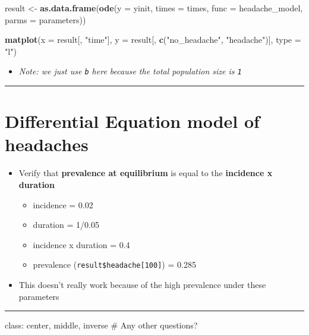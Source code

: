 \documentclass[]{article}
\newenvironment{Shaded}{\begin{snugshade}}{\end{snugshade}}
\newcommand{\KeywordTok}[1]{\textcolor[rgb]{0.13,0.29,0.53}{\textbf{#1}}}
\newcommand{\DataTypeTok}[1]{\textcolor[rgb]{0.13,0.29,0.53}{#1}}
\newcommand{\StringTok}[1]{\textcolor[rgb]{0.31,0.60,0.02}{#1}}
\newcommand{\NormalTok}[1]{#1}
\providecommand{\tightlist}{%
  \setlength{\itemsep}{0pt}\setlength{\parskip}{0pt}}
\begin{document}
\begin{Shaded}
\begin{Highlighting}[]
\NormalTok{result <-}\StringTok{ }\KeywordTok{as.data.frame}\NormalTok{(}\KeywordTok{ode}\NormalTok{(}\DataTypeTok{y =}\NormalTok{ yinit, }\DataTypeTok{times =}\NormalTok{ times, }
                            \DataTypeTok{func =}\NormalTok{ headache_model, }\DataTypeTok{parms =}\NormalTok{ parameters))}

\KeywordTok{matplot}\NormalTok{(}\DataTypeTok{x =}\NormalTok{ result[, }\StringTok{"time"}\NormalTok{], }
        \DataTypeTok{y =}\NormalTok{ result[, }\KeywordTok{c}\NormalTok{(}\StringTok{"no_headache"}\NormalTok{, }\StringTok{"headache"}\NormalTok{)], }\DataTypeTok{type =} \StringTok{"l"}\NormalTok{)}
\end{Highlighting}
\end{Shaded}

\begin{itemize}
\tightlist
\item
  \emph{Note: we just use \texttt{b} here because the total population
  size is \texttt{1}}
\end{itemize}

\begin{center}\rule{0.5\linewidth}{\linethickness}\end{center}

\section{Differential Equation model of
headaches}\label{differential-equation-model-of-headaches-3}

\begin{itemize}
\tightlist
\item
  Verify that \textbf{prevalence at equilibrium} is equal to the
  \textbf{incidence x duration}

  \begin{itemize}
  \item
    incidence = 0.02
  \item
    duration = 1/0.05
  \item
    incidence x duration = 0.4
  \item
    prevalence (\texttt{result\$headache{[}100{]}}) = 0.285
  \end{itemize}
\item
  This doesn't really work because of the high prevalence under these
  parameters
\end{itemize}

\begin{center}\rule{0.5\linewidth}{\linethickness}\end{center}

class: center, middle, inverse \# Any other questions?
\end{document}
